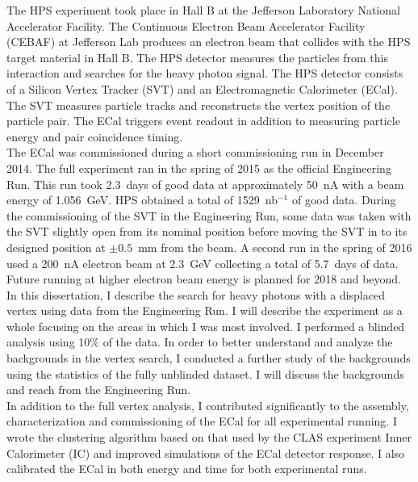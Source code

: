 The HPS experiment took place in Hall B at the Jefferson Laboratory National Accelerator Facility. The Continuous Electron Beam Accelerator Facility (CEBAF) at Jefferson Lab produces an electron beam that collides with the HPS target material in Hall B. The HPS detector measures the particles from this interaction and searches for the heavy photon signal. The HPS detector consists of a Silicon Vertex Tracker (SVT) and an Electromagnetic Calorimeter (ECal). The SVT measures particle tracks and reconstructs the vertex position of the particle pair. The ECal triggers event readout in addition to measuring particle energy and pair coincidence timing. \\
\indent The ECal was commissioned during a short commissioning run in December 2014. The full experiment ran in the spring of 2015 as the official Engineering Run. This run took 2.3~days of good data at approximately 50~nA with a beam energy of 1.056~GeV. HPS obtained a total of 1529~nb$^{-1}$ of good data. During the commissioning of the SVT in the Engineering Run, some data was taken with the SVT slightly open from its nominal position before moving the SVT in to its designed position at $\pm0.5$~mm from the beam. A second run in the spring of 2016 used a 200~nA electron beam at 2.3~GeV collecting a total of 5.7~days of data.  Future running at higher electron beam energy is planned for 2018 and beyond.\\
\indent In this dissertation, I describe the search for heavy photons with a displaced vertex using data from the Engineering Run. I will describe the experiment as a whole focusing on the areas in which I was most involved. I performed a blinded analysis using 10$\%$ of the data. In order to better understand and analyze the backgrounds in the vertex search, I conducted a further study of the backgrounds using the statistics of the fully unblinded dataset. I will discuss the backgrounds and reach from the Engineering Run.\\
\indent In addition to the full vertex analysis, I contributed significantly to the assembly, characterization and commissioning of the ECal for all experimental running. I wrote the clustering algorithm based on that used by the CLAS experiment Inner Calorimeter (IC) and improved simulations of the ECal detector response. I also calibrated the ECal in both energy and time for both experimental runs. 
